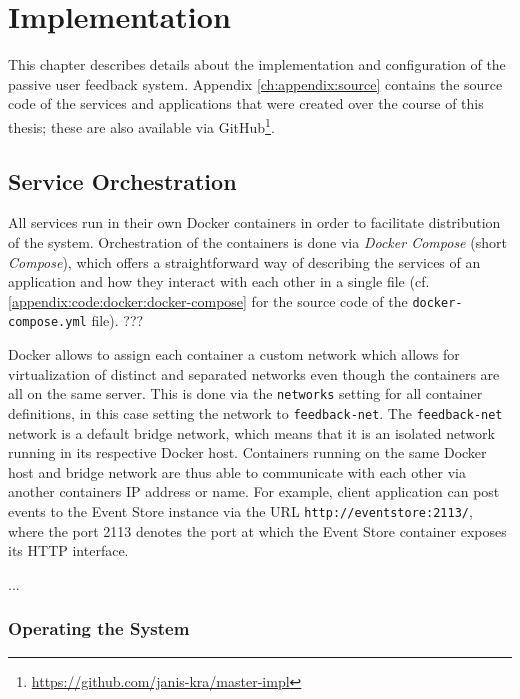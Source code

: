 %
\chapter{Implementation}
\label{ch:implementation}

This chapter describes details about the implementation and configuration of the passive user feedback system.
Appendix \cref{ch:appendix:source} contains the source code of the services and applications that were created over the course of this thesis; these are also available via GitHub\footnote{\url{https://github.com/janis-kra/master-impl}}.

\section{Service Orchestration}
\label{sec:implementation:orchestration}

All services run in their own Docker containers in order to facilitate distribution of the system.
Orchestration of the containers is done via \emph{Docker Compose} (short \emph{Compose}), which offers a straightforward way of describing the services of an application and how they interact with each other in a single file (cf. \cref{appendix:code:docker:docker-compose} for the source code of the \texttt{docker-compose.yml} file).
???

Docker allows to assign each container a custom network which allows for virtualization of distinct and separated networks even though the containers are all on the same server.
This is done via the \texttt{networks} setting for all container definitions, in this case setting the network to \texttt{feedback-net}.
The \texttt{feedback-net} network is a default bridge network, which means that it is an isolated network running in its respective Docker host.
Containers running on the same Docker host and bridge network are thus able to communicate with each other via another containers IP address or name.
For example, client application can post events to the Event Store instance via the URL \texttt{http://eventstore:2113/}, where the port 2113 denotes the port at which the Event Store container exposes its \ac{HTTP} interface.

...

\subsection{Operating the System}

